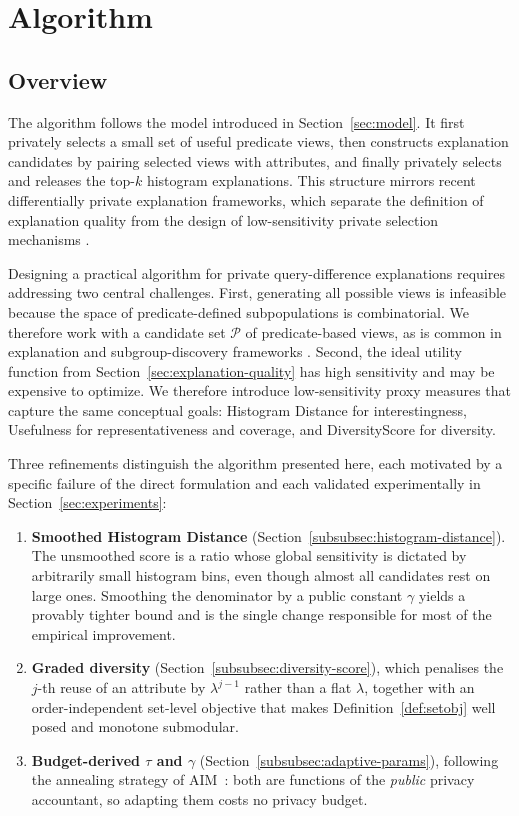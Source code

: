 \section{Algorithm}\label{sec:solution}

\subsection{Overview}
\label{subsec:algorithm-overview}

The algorithm follows the model introduced in Section~\ref{sec:model}.
It first privately selects a small set of useful predicate views, then constructs explanation candidates by pairing selected views with attributes, and finally privately selects and releases the top-$k$ histogram explanations.
This structure mirrors recent differentially private explanation frameworks, which separate the definition of explanation quality from the design of low-sensitivity private selection mechanisms \cite{TaoGMR22}.

Designing a practical algorithm for private query-difference explanations requires addressing two central challenges.
First, generating all possible views is infeasible because the space of predicate-defined subpopulations is combinatorial.
We therefore work with a candidate set $\mathcal{P}$ of predicate-based views, as is common in explanation and subgroup-discovery frameworks \cite{FEDEX,ICDE23}.
Second, the ideal utility function from Section~\ref{sec:explanation-quality} has high sensitivity and may be expensive to optimize.
We therefore introduce low-sensitivity proxy measures that capture the same conceptual goals: Histogram Distance for interestingness, Usefulness for representativeness and coverage, and DiversityScore for diversity.

Three refinements distinguish the algorithm presented here, each motivated by a specific failure of the direct formulation and each validated experimentally in Section~\ref{sec:experiments}:
\begin{enumerate}
  \item \textbf{Smoothed Histogram Distance} (Section~\ref{subsubsec:histogram-distance}). The unsmoothed score is a ratio whose global sensitivity is dictated by arbitrarily small histogram bins, even though almost all candidates rest on large ones. Smoothing the denominator by a public constant $\gamma$ yields a provably tighter bound and is the single change responsible for most of the empirical improvement.
  \item \textbf{Graded diversity} (Section~\ref{subsubsec:diversity-score}), which penalises the $j$-th reuse of an attribute by $\lambda^{j-1}$ rather than a flat $\lambda$, together with an order-independent set-level objective that makes Definition~\ref{def:setobj} well posed and monotone submodular.
  \item \textbf{Budget-derived $\tau$ and $\gamma$} (Section~\ref{subsubsec:adaptive-params}), following the annealing strategy of AIM~\cite{McKennaMSM22}: both are functions of the \emph{public} privacy accountant, so adapting them costs no privacy budget.
\end{enumerate}

